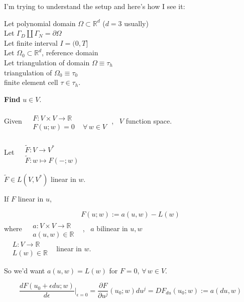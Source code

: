 \documentclass[twoside,landscape,10pt]{amsart}
\theoremstyle{plain}
\theoremstyle{definition}
\theoremstyle{remark}
\begin{document}
\begin{multicols*}{2}
I'm trying to understand the setup and here's how I see it:

Let polynomial domain $\Omega \subset \mathbb{R}^d$ ($d=3$ usually) \\
Let $\Gamma_D \coprod \Gamma_N = \partial \Omega$ \\
Let finite interval $I = (0,T]$ \\
Let $\Omega_0 \subset \mathbb{R}^d$, reference domain \\
Let triangulation of domain $\Omega \equiv \tau_h$ \\
\phantom{Let } triangulation of $\Omega_0 \equiv \tau_0$ \\
\phantom{Let } finite element cell $\tau \in \tau_h$.  

\textbf{Find} $u\in V$.  

Given $\begin{aligned} & \quad \\
  & F: V\times V \to \mathbb{R} \\
  & F(u;w) = 0 \quad \, \forall \, w \in V \end{aligned}$ , \, $V$ function space. 

Let $\begin{aligned} & \quad \\
  & \widetilde{F}:V \to V^* \\
  & \widetilde{F}:w \mapsto F(-;w) \end{aligned}$

$\widetilde{F} \in L(V,V^*)$ linear in $w$.  

If $F$ linear in $u$, 

\[
F(u;w) := a(u,w)- L(w)
\]
where $\begin{aligned} & \quad \\
  & a: V \times V \to \mathbb{R} \\
  & a(u,w) \in \mathbb{R} \end{aligned}$ \, , \, $a$ bilinear in $u,w$ \\
\phantom{where} $\begin{aligned} 
  & L : V \to \mathbb{R} \\
  & L(w) \in \mathbb{R} \end{aligned}$ \, linear in $w$.  

So we'd want $a(u,w) = L(w)$ for $F=0$, $\forall \, w \in V$.    

\[
\frac{dF(u_0 + \epsilon du; w)}{ d\epsilon} \left. \right|_{\epsilon=0} = \frac{ \partial F}{ \partial u^j}(u_0 ;w) du^j = DF_{du}(u_0;w) := a(du,w)
\]


\end{multicols*}
\end{document}
